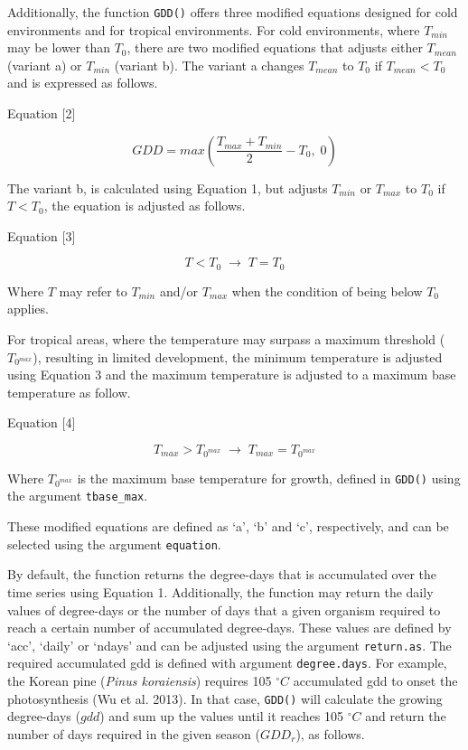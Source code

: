\documentclass[
]{article}
\begin{document}
Additionally, the function \texttt{GDD()} offers three modified
equations designed for cold environments and for tropical environments.
For cold environments, where \(T_{min}\) may be lower than \(T_{0}\),
there are two modified equations that adjusts either \(T_{mean}\)
(variant a) or \(T_{min}\) (variant b). The variant a changes
\(T_{mean}\) to \(T_{0}\) if \(T_{mean} < T_{0}\) and is expressed as
follows.

Equation {[}2{]}

\[ GDD = max \left(\frac{T_{max} + T_{min}}{2} - T_{0}, \; 0 \right)\]

The variant b, is calculated using Equation 1, but adjusts \(T_{min}\)
or \(T_{max}\) to \(T_{0}\) if \(T < T_{0}\), the equation is adjusted
as follows.

Equation {[}3{]}

\[ T < T_{0} \; \rightarrow \; T = T_{0} \]

Where \(T\) may refer to \(T_{min}\) and/or \(T_{max}\) when the
condition of being below \(T_{0}\) applies.

For tropical areas, where the temperature may surpass a maximum
threshold (\(T_{0^{max}}\)), resulting in limited development, the
minimum temperature is adjusted using Equation 3 and the maximum
temperature is adjusted to a maximum base temperature as follow.

Equation {[}4{]}

\[ T_{max} > T_{0^{max}} \; \rightarrow \; T_{max} = T_{0^{max}} \]

Where \(T_{0^{max}}\) is the maximum base temperature for growth,
defined in \texttt{GDD()} using the argument \texttt{tbase\_max}.

These modified equations are defined as `a', `b' and `c', respectively,
and can be selected using the argument \texttt{equation}.

By default, the function returns the degree-days that is accumulated
over the time series using Equation 1. Additionally, the function may
return the daily values of degree-days or the number of days that a
given organism required to reach a certain number of accumulated
degree-days. These values are defined by `acc', `daily' or `ndays' and
can be adjusted using the argument \texttt{return.as}. The required
accumulated gdd is defined with argument \texttt{degree.days}. For
example, the Korean pine (\emph{Pinus koraiensis}) requires 105
\(^\circ C\) accumulated gdd to onset the photosynthesis (Wu et al.
2013). In that case, \texttt{GDD()} will calculate the growing
degree-days (\(gdd\)) and sum up the values until it reaches 105
\(^\circ C\) and return the number of days required in the given season
(\(GDD_{r}\)), as follows.
\end{document}
